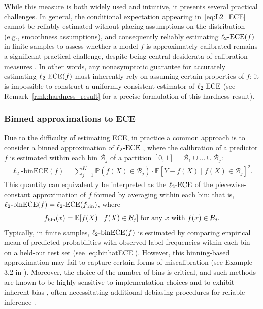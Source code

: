 \documentclass[11pt]{article}
\numberwithin{equation}{section}
\theoremstyle{definition}
\newcommand{\E}{\mathbb{E}}
\renewcommand{\P}{\mathbb{P}}
\newcommand{\cB}{\mathcal{B}}
\newcommand{\ECE}{\mathrm{ECE}}
\newcommand{\lECE}{\ell_2\textnormal{-}\ECE}
\newcommand{\binECE}{\mathrm{binECE}}
\newcommand{\lbinECE}{\ell_2\textnormal{-}\binECE}
\begin{document}
While this measure is both widely used and intuitive, it presents several practical challenges. In general, the conditional expectation appearing in~\eqref{eq:L2_ECE} cannot be reliably estimated without placing assumptions on the distribution (e.g., smoothness assumptions), and consequently reliably estimating $\lECE(f)$ in finite samples to assess whether a model $f$ is approximately calibrated remains a significant practical challenge, despite being central desiderata of calibration measures \citep{lee2023t,ciosek2026measuring,rossellini2025can,brocker2022uniform,gupta2020distribution,angelopoulos2024theoretical}.  In other words, any nonasymptotic guarantee for accurately estimating $\lECE(f)$ must inherently rely on assuming certain properties of $f$; it is impossible to construct a uniformly consistent estimator of $\lECE$ (see Remark~\ref{rmk:hardness_result} for a precise formulation of this hardness result).

\subsubsection{Binned approximations to ECE} 
Due to the difficulty of estimating ECE, in practice a common approach is to consider a binned approximation of $\lECE$ \citep{guo2017calibration,naeini2015obtaining}, where the calibration of a predictor $f$ is estimated within each bin $\cB_j$ of a partition $[0,1] = \cB_1 \cup \dots \cup \cB_j$:
\begin{align}\label{eq:L2_binned_ECE}
\ell_2\text{-binECE}(f) = \sum_{j=1}^{K} \P\left(f(X)\in \cB_j\right) \cdot  \E\left[Y-f(X)\mid f(X)\in \cB_j\right]^2.
\end{align}
This quantity can equivalently be interpreted as the $\lECE$ of the piecewise-constant approximation of $f$ formed by averaging within each bin: that is, $\ell_2\text{-binECE}(f) = \lECE(f_{\mathrm{bin}})$, where
\begin{equation}\label{eqn:fbin}
    f_{\mathrm{bin}}(x) = \E[f(X) \mid f(X)\in \cB_j]\textnormal{ for any $x$ with $f(x)\in \cB_j$}.
\end{equation}Typically, in finite samples, $\lbinECE(f)$ is estimated by comparing empirical mean of predicted probabilities with observed label frequencies within each bin on a held-out test set (see \eqref{eq:binhatECE}). However, this binning-based approximation may fail to capture certain forms of miscalibration (see Example 3.2 in \cite{kumar2019verified}). Moreover, the choice of the number of bins is critical, and such methods are known to be highly sensitive to implementation choices and to exhibit inherent bias \citep{nixon2019measuring,roelofs2022mitigating,futami2024information,tao2024benchmark}, often necessitating additional debiasing procedures for reliable inference \citep{sun2024confidence,lee2023t,kumar2019verified}. 
\end{document}
